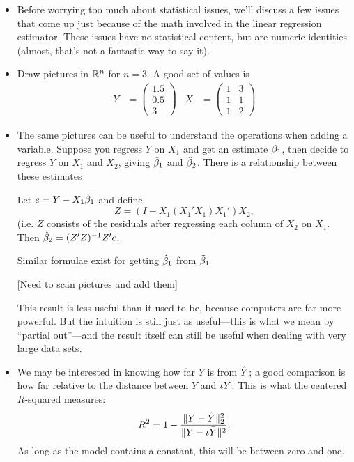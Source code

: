 \begin{itemize}

\item Before worrying too much about statistical issues, we'll discuss
  a few issues that come up just because of the math involved in the
  linear regression estimator.  These issues have no statistical
  content, but are numeric identities (almost, that's not a fantastic
  way to say it).

\item Draw pictures in $\mathbb{R}^n$ for $n = 3$.  A good set of values is
  \begin{align*}
    Y &= \begin{pmatrix}1.5 \\ 0.5 \\ 3\end{pmatrix}&
    X &=
    \begin{pmatrix}
      1  &  3 \\
      1  &  1 \\
      1  &  2
    \end{pmatrix}
  \end{align*}

\item The same pictures can be useful to understand the operations
  when adding a variable.  Suppose you regress $Y$ on $X_1$ and get an
  estimate $\tilde{\beta}_1$, then decide to regress $Y$ on $X_1$ and $X_2$, giving
  $\hat{\beta}_1$ and $\hat{\beta}_2$.  There is a relationship between these estimates
  \begin{thm}
    Let $e = Y - X_1\tilde{\beta}_1$ and define
    \begin{equation*}
      Z = (I - X_1(X_1'X_1)X_1')X_2,
    \end{equation*}
    (i.e. $Z$ consists of the residuals after regressing each column
    of $X_2$ on $X_1$.  Then $\hat{\beta}_2 = (Z'Z)^{-1}Z'e$.
  \end{thm}
  Similar formulae exist for getting $\hat{\beta}_1$ from $\tilde{\beta}_1$

  [Need to scan pictures and add them]

  This result is less useful than it used to be, because computers are
  far more powerful.  But the intuition is still just as useful---this
  is what we mean by ``partial out''---and the result itself can still
  be useful when dealing with very large data sets.

\item We may be interested in knowing how far $Y$ is from $\hat{Y}$; a
  good comparison is how far relative to the distance between $Y$ and
  $\iota \bar{Y}$.  This is what the centered $R$-squared measures:
  \begin{equation*}
    R^2 = 1 - \frac{ \lVert Y - \hat{Y} \rVert_2^2}{\lVert Y - \iota \bar{Y} \rVert^2}.
  \end{equation*}
  As long as the model contains a constant, this will be between zero
  and one.


\end{itemize}
